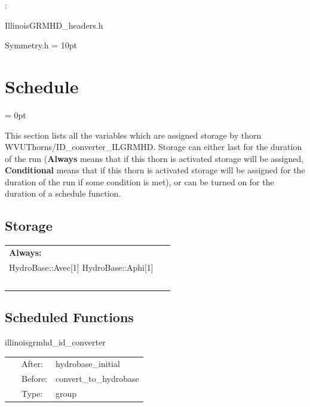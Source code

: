 \documentclass{article}
\begin{document}
: 

IllinoisGRMHD\_headers.h

Symmetry.h
\vspace{2mm}\parskip = 10pt 

\section{Schedule} 


\parskip = 0pt


\noindent This section lists all the variables which are assigned storage by thorn WVUThorns/ID\_converter\_ILGRMHD.  Storage can either last for the duration of the run ({\bf Always} means that if this thorn is activated storage will be assigned, {\bf Conditional} means that if this thorn is activated storage will be assigned for the duration of the run if some condition is met), or can be turned on for the duration of a schedule function.


\subsection*{Storage}

\hspace{5mm}

 \begin{tabular*}{160mm}{ll} 

{\bf Always:}&  ~ \\ 
 HydroBase::Avec[1] HydroBase::Aphi[1] & ~\\ 
~ & ~\\ 
\end{tabular*} 


\subsection*{Scheduled Functions}
\vspace{5mm}


\hspace{5mm} illinoisgrmhd\_id\_converter 

\hspace{5mm}{\it translate et-generated, hydrobase-compatible initial data and convert into variables used by illinoisgrmhd } 


\hspace{5mm}

 \begin{tabular*}{160mm}{cll} 
~ & After:  & hydrobase\_initial \\ 
~ & Before:  & convert\_to\_hydrobase \\ 
~ & Type:  & group \\ 
\end{tabular*} 
\end{document}
